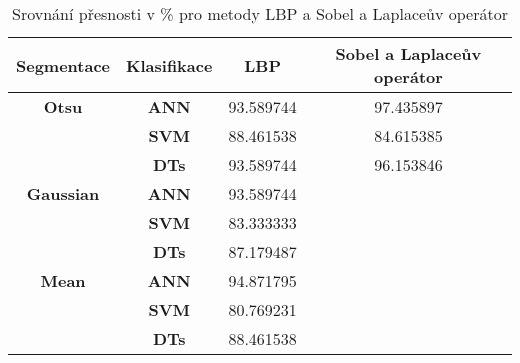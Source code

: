\capstartfalse
\begin{table}[!htbp]
\centering
\begin{tabular}{|c|c|c|c|}
\hline
\textbf{Segmentace} & \textbf{Klasifikace} & \textbf{LBP} & \textbf{Sobel a Laplaceův operátor} \\ \hline
\textbf{Otsu}       & \textbf{ANN}         & 93.589744    & 97.435897                           \\ \hline
\textbf{}           & \textbf{SVM}         & 88.461538    & 84.615385                           \\ \hline
\textbf{}           & \textbf{DTs}         & 93.589744    & 96.153846                           \\ \hline
\textbf{Gaussian}   & \textbf{ANN}         & 93.589744    &                                     \\ \hline
\textbf{}           & \textbf{SVM}         & 83.333333    &                                     \\ \hline
\textbf{}           & \textbf{DTs}         & 87.179487    &                                     \\ \hline
\textbf{Mean}       & \textbf{ANN}         & 94.871795    &                                     \\ \hline
\textbf{}           & \textbf{SVM}         & 80.769231    &                                     \\ \hline
\textbf{}           & \textbf{DTs}         & 88.461538    &                                     \\ \hline
\end{tabular}
\caption{Srovnání přesnosti v \% pro metody LBP a Sobel a Laplaceův operátor }
\end{table}
\capstarttrue



